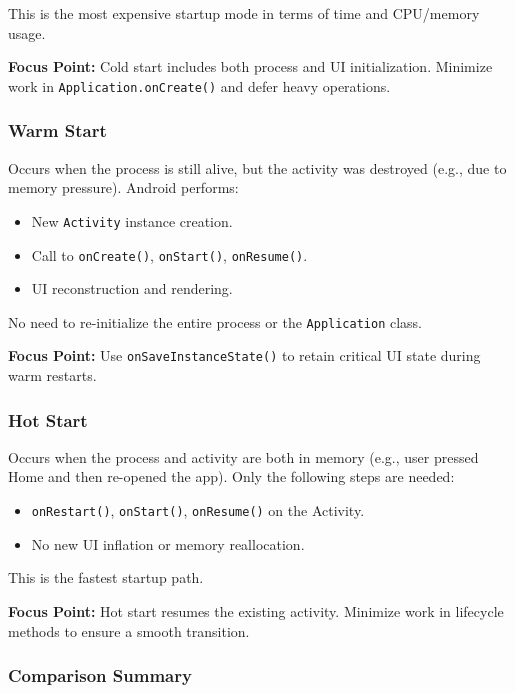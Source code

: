 \documentclass[a4paper,12pt]{article}
\begin{document}
This is the most expensive startup mode in terms of time and CPU/memory usage.

\textbf{Focus Point:} Cold start includes both process and UI initialization. Minimize work in \texttt{Application.onCreate()} and defer heavy operations.

\subsubsection{Warm Start}

Occurs when the process is still alive, but the activity was destroyed (e.g., due to memory pressure). Android performs:

\begin{itemize}
  \item New \texttt{Activity} instance creation.
  \item Call to \texttt{onCreate()}, \texttt{onStart()}, \texttt{onResume()}.
  \item UI reconstruction and rendering.
\end{itemize}

No need to re-initialize the entire process or the \texttt{Application} class.

\textbf{Focus Point:} Use \texttt{onSaveInstanceState()} to retain critical UI state during warm restarts.

\subsubsection{Hot Start}

Occurs when the process and activity are both in memory (e.g., user pressed Home and then re-opened the app). Only the following steps are needed:

\begin{itemize}
  \item \texttt{onRestart()}, \texttt{onStart()}, \texttt{onResume()} on the Activity.
  \item No new UI inflation or memory reallocation.
\end{itemize}

This is the fastest startup path.

\textbf{Focus Point:} Hot start resumes the existing activity. Minimize work in lifecycle methods to ensure a smooth transition.

\subsubsection{Comparison Summary}
\end{document}
